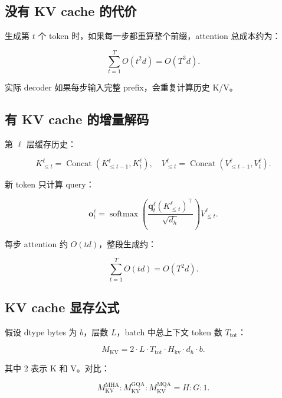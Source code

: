 \documentclass[UTF8,12pt]{ctexart}
\newcommand{\1}{\mathbf{1}}
\newcommand{\softmax}{\operatorname{softmax}}
\begin{document}
\subsection{没有 KV cache 的代价}

生成第 $t$ 个 token 时，如果每一步都重算整个前缀，attention 总成本约为：

\begin{equation}
\sum_{t=1}^{T}O(t^2d)
=O(T^3d).
\end{equation}

实际 decoder 如果每步输入完整 prefix，会重复计算历史 K/V。

\subsection{有 KV cache 的增量解码}

第 $\ell$ 层缓存历史：

\begin{equation}
K_{\le t}^{\ell}
=\operatorname{Concat}(K_{\le t-1}^{\ell},K_t^{\ell}),
\quad
V_{\le t}^{\ell}
=\operatorname{Concat}(V_{\le t-1}^{\ell},V_t^{\ell}).
\end{equation}

新 token 只计算 query：

\begin{equation}
\bm{o}_t^\ell
=\softmax\left(
\frac{\bm{q}_t^\ell (K_{\le t}^{\ell})^\top}{\sqrt{d_h}}
\right)V_{\le t}^{\ell}.
\label{eq:kv-cache-attn}
\end{equation}

每步 attention 约 $O(td)$，整段生成约：

\begin{equation}
\sum_{t=1}^{T}O(td)=O(T^2d).
\end{equation}

\subsection{KV cache 显存公式}

假设 dtype bytes 为 $b$，层数 $L$，batch 中总上下文 token 数 $T_{\mathrm{tot}}$：

\begin{equation}
M_{\mathrm{KV}}
=2\cdot L\cdot T_{\mathrm{tot}}\cdot H_{\mathrm{kv}}\cdot d_h\cdot b.
\label{eq:kv-memory}
\end{equation}

其中 2 表示 K 和 V。对比：

\begin{equation}
M_{\mathrm{KV}}^{\mathrm{MHA}}:M_{\mathrm{KV}}^{\mathrm{GQA}}:M_{\mathrm{KV}}^{\mathrm{MQA}}
=H:G:1.
\end{equation}
\end{document}
